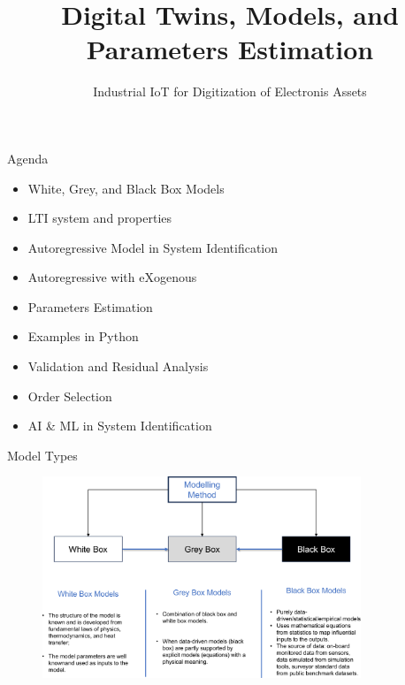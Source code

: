 \documentclass[aspectratio=169,hyperref={pdfpagelabels=false}]{beamer}
\subtitle{\normalsize{Industrial IoT for Digitization of Electronis Assets}}
\title{Digital Twins, Models, and Parameters Estimation}
\begin{document}
\inserttitlepage

\begin{frame}{Agenda}
  \begin{itemize}
    \item White, Grey, and Black Box Models
    \item LTI system and properties
    \item Autoregressive Model in System Identification
    \item Autoregressive with eXogenous 
    \item Parameters Estimation
    \item Examples in Python 
    \item Validation and Residual Analysis
    \item Order Selection
    \item AI \& ML in System Identification
  \end{itemize}
\end{frame}

\begin{frame}{Model Types}
  \begin{figure}[t]
    \centering
    \includegraphics[width=0.85\textwidth]{img/modelling_methods.pdf}
\end{figure}
\end{frame}
\end{document}
